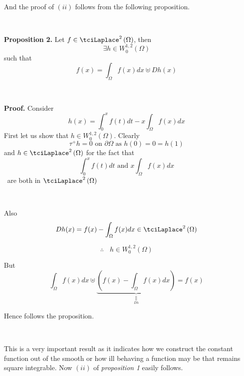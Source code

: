 \documentclass{amsproc}
\theoremstyle{plain}
\numberwithin{equation}{section}
\begin{document}
\ \ \ \ 

And the proof of $\left( ii\right) $ follows from the following proposition.

\ \ \ 

\textbf{Proposition 2. }Let $f\in \tciLaplace ^{2}\left( \Omega \right) $,
then 
\begin{equation*}
\exists h\in W_{0}^{1,2}\left( \Omega \right)
\end{equation*}such that\begin{equation*}
f(x)=\int_{\Omega }f(x)dx\uplus Dh(x)
\end{equation*}

\ \ 

\textbf{Proof.} Consider 
\begin{equation*}
h\left( x\right) =\int_{0}^{x}f(t)dt-x\int_{\Omega }f(x)dx
\end{equation*}First let us show that $h\in W_{0}^{1,2}\left( \Omega \right) $. Clearly 
\begin{equation*}
\tau ^{+}h=0\text{ on }\partial \Omega \text{\ \ as }h\left( 0\right)
=0=h\left( 1\right)
\end{equation*}and $h\in \tciLaplace ^{2}\left( \Omega \right) $ for the fact that 
\begin{equation*}
\int_{0}^{x}f(t)dt\text{ \ \ \ and \ \ }x\int_{\Omega }f(x)dx
\end{equation*}\ are both in $\tciLaplace ^{2}\left( \Omega \right) $

\ 

Also 
\begin{equation*}
Dh(x)=f(x)-\int_{\Omega }f(x)dx\in \tciLaplace ^{2}\left( \Omega \right)
\end{equation*}

\begin{equation*}
\therefore \ \ \ \ h\in W_{0}^{1,2}\left( \Omega \right)
\end{equation*}

But\begin{equation*}
\int_{\Omega }f(x)dx\uplus \underset{\underset{Dh}{\parallel }}{\underbrace{\left( f(x)-\int_{\Omega }f(x)dx\right) }}=f(x)
\end{equation*}

Hence follows the proposition.

\ 

This is a very important result as it indicates how we construct the
constant function out of the smooth or how ill behaving a function may be
that remains square integrable. Now $(ii)$ of \textit{proposition 1} easily
follows.
\end{document}
